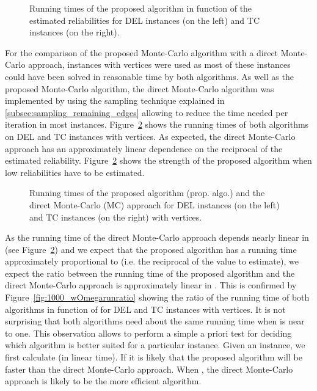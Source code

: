 \documentclass{article}
\begin{document}
\begin{figure}[h!]
\begin{center}
\caption{\label{fig:relrun} Running times of the proposed algorithm in
  function of the estimated reliabilities for DEL instances (on
  the left) and TC instances (on the right).}
\end{center}
\end{figure}

For the comparison of the proposed \mbox{Monte-Carlo} algorithm with
a direct \mbox{Monte-Carlo} approach, instances with  vertices
were used as most of these instances could have been solved in
reasonable time by both algorithms. As well as the proposed
\mbox{Monte-Carlo} algorithm, the direct \mbox{Monte-Carlo}
algorithm was implemented by using the sampling technique explained
in \ref{subsec:sampling_remaining_edges} allowing to reduce the
time needed per iteration in most instances.
Figure~\ref{fig:1000_compare} shows
the running times of both algorithms on DEL and TC instances with 
vertices. As expected, the direct \mbox{Monte-Carlo} approach has an
approximately linear dependence on the reciprocal of the
estimated reliability.
Figure~\ref{fig:1000_compare} shows
the strength of the proposed algorithm when low reliabilities
have to be estimated.

\begin{figure}[h!]
\begin{center}
\caption{\label{fig:1000_compare} Running times of the proposed
algorithm (prop. algo.) and the direct \mbox{Monte-Carlo} (MC) approach
for DEL instances (on the left) and TC instances (on the right) with 
 vertices.}
\end{center}
\end{figure}

As the running time of the direct \mbox{Monte-Carlo} approach
depends nearly linear in  (see
Figure~\ref{fig:1000_compare}) and
we expect that the proposed algorithm has a running time approximately
proportional to  (i.e. the reciprocal of the value
to estimate), we
expect the ratio between the running time of the proposed algorithm
and the direct \mbox{Monte-Carlo} approach is approximately linear
in . This is confirmed by Figure~\ref{fig:1000_wOmegarunratio}
showing the ratio of the running time of both algorithms in function
of  for DEL and TC instances with  vertices.
It is not surprising that both algorithms need about the same running time
when  is near to one. This observation allows to perform a
simple a priori test for deciding which algorithm is better suited
for a particular instance. Given an instance, we first calculate
 (in linear time). If  it is likely that
the proposed algorithm will be faster than the direct \mbox{Monte-Carlo}
approach. When , the direct \mbox{Monte-Carlo} approach
is likely to be the more efficient algorithm.
\end{document}
